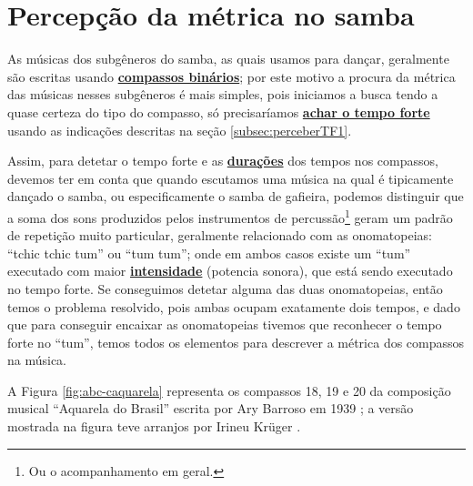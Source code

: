 \section{Percepção da métrica no samba}
\label{sec:percepcaosamba1}

As músicas dos subgêneros do samba, as quais usamos para dançar, 
geralmente são escritas usando \hyperref[subsec:compassobinario]{\textbf{compassos binários}};
por este motivo a procura da métrica das músicas nesses subgêneros 
é mais simples, 
pois iniciamos a busca tendo a quase certeza do tipo do compasso, 
só precisaríamos \hyperref[subsec:perceberTF1]{\textbf{achar o tempo forte}} 
usando as indicações descritas na seção \ref{subsec:perceberTF1}.

Assim, para detetar o tempo forte e as \hyperref[sec:pos:Duracion]{\textbf{durações}} dos tempos nos compassos,
devemos ter em conta que quando escutamos uma música 
na qual é tipicamente dançado o samba, ou especificamente o samba de gafieira,
podemos distinguir que a soma dos sons produzidos pelos instrumentos de percussão\footnote{Ou o
acompanhamento em geral.} 
geram um padrão de repetição muito particular, 
geralmente relacionado com as onomatopeias: ``tchic tchic tum'' ou ``tum tum'';
onde em ambos  casos existe um  ``tum'' executado com maior 
\hyperref[sec:pos:Intensidade]{\textbf{intensidade}} (potencia sonora),
que está sendo executado no tempo forte.
Se conseguimos detetar alguma das duas onomatopeias,
então temos o problema resolvido, pois ambas ocupam exatamente dois tempos,
e dado que para conseguir encaixar as onomatopeias tivemos que reconhecer o tempo forte no ``tum'',
temos todos os elementos para descrever a métrica dos compassos na música.


A Figura \ref{fig:abc-caquarela} representa os compassos 18, 19 e 20 da  
composição musical ``Aquarela do Brasil'' escrita
por Ary Barroso em 1939 \cite{AquarelaDoBrasil}; 
a versão mostrada na figura teve arranjos por Irineu Krüger \cite{Irineu}.\\ 


